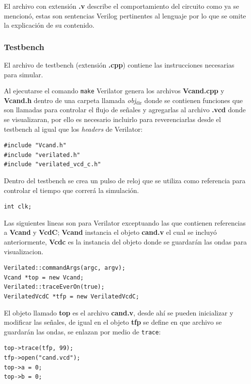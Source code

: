 \documentclass[11pt]{/home/hao/dev/org/latex-plantilla/IEEEtran}
\begin{document}
El archivo con extensión \textbf{.v} describe el comportamiento del
circuito como ya se mencionó, estas son sentencias Verilog
pertinentes al lenguaje por lo que se omite la explicación de su
contenido.

\subsubsection{Testbench}
\label{sec:org9161363}
El archivo de testbench (extensión \textbf{.cpp}) contiene las
instrucciones necesarias para simular.

Al ejecutarse el comando \texttt{make} Verilator genera los archivos
\textbf{Vcand.cpp} y \textbf{Vcand.h} dentro de una carpeta llamada \emph{obj\(_{\text{dir}}\)}
donde se contienen funciones que son llamadas para controlar el
flujo de señales y agregarlas al archivo \textbf{.vcd} donde se
visualizaran, por ello es necesario incluirlo para reverenciarlas
desde el testbench al igual que los \emph{headers} de Verilator:

\begin{verbatim}
#include "Vcand.h"
#include "verilated.h"
#include "verilated_vcd_c.h"
\end{verbatim}

Dentro del testbench se crea un pulso de reloj que se utiliza como
referencia para controlar el tiempo que correrá la simulación.

\begin{verbatim}
int clk;
\end{verbatim}

Las siguientes lineas son para Verilator exceptuando las que
contienen referencias a \textbf{Vcand} y \textbf{VcdC}; \textbf{Vcand} instancia el
objeto \textbf{cand.v} el cual se incluyó anteriormente, \textbf{Vcdc} es la
instancia del objeto donde se guardarán las ondas para
visualizacion.

\begin{verbatim}
Verilated::commandArgs(argc, argv);
Vcand *top = new Vcand;
Verilated::traceEverOn(true);
VerilatedVcdC *tfp = new VerilatedVcdC;
\end{verbatim}

El objeto llamado \textbf{top} es el archivo \textbf{cand.v}, desde ahí se
pueden inicializar y modificar las señales, de igual en el objeto
\textbf{tfp} se define en que archivo se guardarán las ondas, se enlazan
por medio de \texttt{trace}:

\begin{verbatim}
top->trace(tfp, 99);
tfp->open("cand.vcd");
top->a = 0;
top->b = 0;
\end{verbatim}
\end{document}
